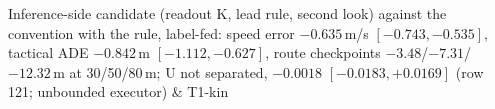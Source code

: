 Inference-side candidate (readout K, lead rule, second look) against the convention with the rule, label-fed: speed error $-0.635$\,m/s $[-0.743,-0.535]$, tactical ADE $-0.842$\,m $[-1.112,-0.627]$, route checkpoints $-3.48$/$-7.31$/$-12.32$\,m at 30/50/80\,m; U not separated, $-0.0018$ $[-0.0183,+0.0169]$ (row 121; unbounded executor) & T1-kin \\
